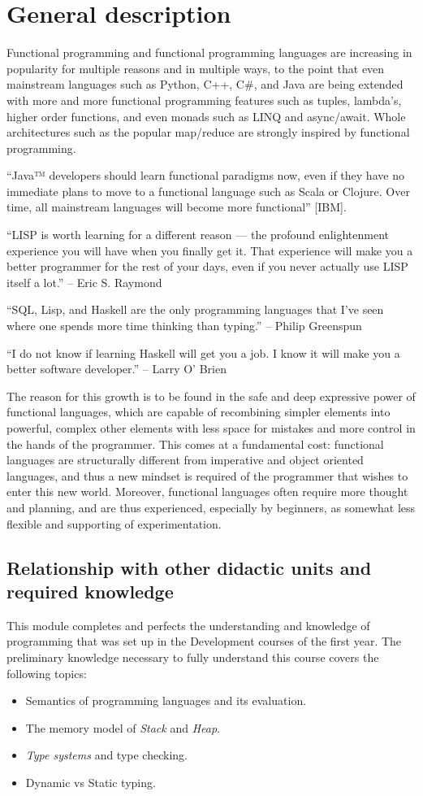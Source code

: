 \section{General description}

Functional programming and functional programming languages are increasing in popularity for multiple reasons and in multiple ways, to the point that even mainstream languages such as Python, C++, C\#, and Java are being extended with more and more functional programming features such as tuples, lambda's, higher order functions, and even monads such as LINQ and async/await. Whole architectures such as the popular map/reduce are strongly inspired by functional programming.

``Java™ developers should learn functional paradigms now, even if they have no immediate plans to move to a functional language such as Scala or Clojure. Over time, all mainstream languages will become more functional'' [IBM].

``LISP is worth learning for a different reason — the profound enlightenment experience you will have when you finally get it. That experience will make you a better programmer for the rest of your days, even if you never actually use LISP itself a lot.'' – Eric S. Raymond

``SQL, Lisp, and Haskell are the only programming languages that I've seen where one spends more time thinking than typing.'' – Philip Greenspun

``I do not know if learning Haskell will get you a job. I know it will make you a better software developer.'' – Larry O’ Brien

The reason for this growth is to be found in the safe and deep expressive power of functional languages, which are capable of recombining simpler elements into powerful, complex other elements with less space for mistakes and more control in the hands of the programmer. This comes at a fundamental cost: functional languages are structurally different from imperative and object oriented languages, and thus a new mindset is required of the programmer that wishes to enter this new world. Moreover, functional languages often require more thought and planning, and are thus experienced, especially by beginners, as somewhat less flexible and supporting of experimentation.

\subsection{Relationship with other didactic units and required knowledge}
This module completes and perfects the understanding and knowledge of programming that was set up in the Development courses of the first year. The preliminary knowledge necessary to fully understand this course covers the following topics:

\begin{itemize}[noitemsep]
\item Semantics of programming languages and its evaluation.
\item The memory model of \textit{Stack} and \textit{Heap}.
\item \textit{Type systems} and type checking.
\item Dynamic vs Static typing.
\end{itemize}
